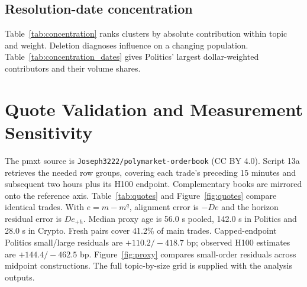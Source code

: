 \documentclass[sigconf,anonymous,nonacm,balance=false]{acmart}
\newcommand{\tabstyle}{\setlength{\tabcolsep}{3pt}}
\begin{document}
\subsection{Resolution-date concentration}
\label{app:concentration}
Table~\ref{tab:concentration} ranks clusters by absolute contribution within topic and weight. Deletion diagnoses influence on a changing population. Table~\ref{tab:concentration_dates} gives Politics' largest dollar-weighted contributors and their volume shares.
\begin{table}[!htbp]
\centering
\caption{Settlement margins and deletion of influential topic-date clusters. Probability bp; parentheses are event-cluster SEs. The final column is the five largest clusters' share of absolute contributions.}
\label{tab:concentration}
\tabstyle

\end{table}
\begin{table}[!htbp]
\centering
\caption{The five largest Politics resolution-date contributors by absolute dollar-weighted contribution. Dollar shares are percentages; contributions are probability bp.}
\label{tab:concentration_dates}
\tabstyle

\end{table}

\section{Quote Validation and Measurement Sensitivity}
\label{app:measurement}
\label{sec:quotes}
\label{sec:proxy}
The pmxt source is \nolinkurl{Joseph3222/polymarket-orderbook} (CC BY 4.0). Script 13a retrieves the needed row groups, covering each trade's preceding 15 minutes and subsequent two hours plus its H100 endpoint. Complementary books are mirrored onto the reference axis. Table~\ref{tab:quotes} and Figure~\ref{fig:quotes} compare identical trades. With $e=m-m^q$, alignment error is $-De$ and the horizon residual error is $De_{+h}$. Median proxy age is 56.0 s pooled, 142.0 s in Politics and 28.0 s in Crypto. Fresh pairs cover 41.2\% of main trades. Capped-endpoint Politics small/large residuals are $+110.2/-418.7$ bp; observed H100 estimates are $+144.4/-462.5$ bp. Figure~\ref{fig:proxy} compares small-order residuals across midpoint constructions. The full topic-by-size grid is supplied with the analysis outputs.
\begin{table}[!tbp]
\centering
\caption{Quoted midpoint estimates and paired proxy-minus-quote differences on pmxt-covered main-sample trades. Clock residuals apply the R/S common-horizon rules and same-day quote availability. Market/trade counts describe the pre-trade match. Probability bp; event-cluster SEs.}
\label{tab:quotes}
\tabstyle

\end{table}
\end{document}
